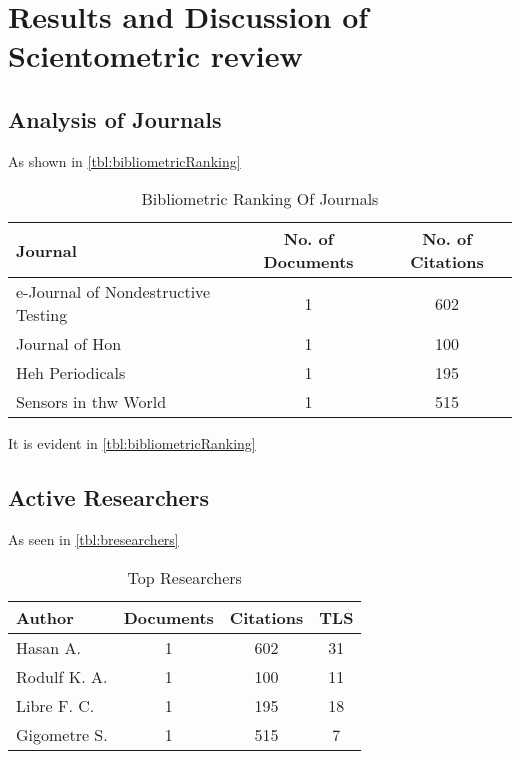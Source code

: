 \documentclass[journal, a4paper]{IEEEtran}
\begin{document}
\section{Results and Discussion of Scientometric review}
\lipsum[1]


\subsection{Analysis of Journals}
As shown in \autoref{tbl:bibliometricRanking} \lipsum[1]


\begin{table}[htbp]

  \centering
  \caption{Bibliometric Ranking Of Journals}
  \label{tbl:bibliometricRanking}
  \begin{tabular}{lcc}

      \toprule
      \textbf{Journal} & \textbf{No. of Documents} & \textbf{No. of Citations} \\
      \midrule
      e-Journal of Nondestructive Testing                   & 1     & 602   \\
      Journal of Hon                   & 1     & 100   \\
      Heh Periodicals                  & 1     & 195   \\
      Sensors in thw World             & 1     & 515   \\
      \bottomrule
  \end{tabular}
\end{table}

It is evident in \autoref{tbl:bibliometricRanking} \lipsum[1]


\subsection{Active Researchers}
As seen in \autoref{tbl:bresearchers} \lipsum[1]

\begin{table}[htbp]

  \centering
  \caption{Top Researchers}
  \label{tbl:bresearchers}
  \begin{tabular}{lccc}

      \toprule
      \textbf{Author} & \textbf{Documents} & \textbf{Citations} & \textbf{TLS} \\
      \midrule
      Hasan A.                   & 1     & 602   &  31         \\
      Rodulf K. A.               & 1     & 100   &  11         \\
      Libre F. C.                & 1     & 195   &  18         \\
      Gigometre S.               & 1     & 515   &  7          \\
      \bottomrule
  \end{tabular}
\end{table}
\end{document}
